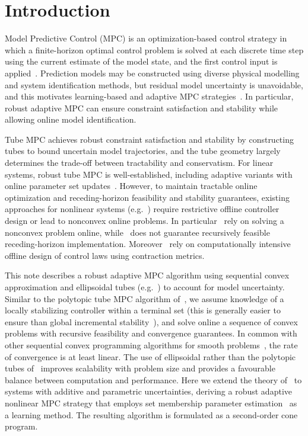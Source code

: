 \documentclass{IEEEtran}
\theoremstyle{definition}
\theoremstyle{remark}
\begin{document}
\section{Introduction}\label{introduction}
Model Predictive Control (MPC) is an optimization-based control strategy in which a finite-horizon optimal control problem is solved at each discrete time step using the current estimate of the model state, and the first control input is applied~\cite{Kou16}.
Prediction models may be constructed using diverse physical modelling and system identification methods, but residual model uncertainty is unavoidable, and this motivates learning-based and adaptive MPC strategies~\cite{Ade09,Lor19,Hew20}. In particular, robust adaptive MPC can ensure constraint satisfaction and stability while allowing online model identification.

%
Tube MPC achieves robust constraint satisfaction and stability by constructing tubes to bound uncertain model trajectories, and the tube geometry largely determines the trade-off between tractability and conservatism.
%
For linear systems, robust tube MPC is well-established, including adaptive variants with online parameter set updates~\cite{Lor19,Lu21}.  
%
However, to maintain tractable online optimization and receding-horizon feasibility and stability guarantees, existing approaches for nonlinear systems (e.g.~\cite{Ade09,Koh21,Sasfi23,leeman23,Bue24}) require restrictive offline controller design or lead to nonconvex online problems.
%
In particular~\cite{Ade09,Koh21,Sasfi23} rely on solving  a nonconvex problem online, while~\cite{leeman23} does not guarantee recursively feasible receding-horizon implementation.
%
Moreover~\cite{Koh21,Sasfi23} rely on computationally intensive offline design of control laws using contraction metrics.
%

This note describes a robust adaptive MPC algorithm   
using sequential convex approximation and ellipsoidal tubes (e.g.~\cite{kurzhanski02}) to account for model uncertainty. 
%
Similar to the polytopic tube MPC algorithm of~\cite{Bue24}, we assume knowledge of a locally stabilizing controller within a terminal set (this is generally easier to ensure than global incremental stability~\cite{Koh21,Sasfi23}), and solve online a sequence of convex problems with recursive feasibility and convergence guarantees. In common with other sequential convex programming algorithms for smooth problems~\cite{messerer21}, the rate of convergence is at least linear. 
%
The use of ellipsoidal rather than the polytopic tubes of~\cite{Bue24}  improves scalability with problem size and provides a favourable balance between computation and performance.
%
Here we extend the theory of~\cite{Can11} to systems with additive and parametric uncertainties, deriving a robust adaptive nonlinear MPC strategy that employs set membership parameter estimation~\cite{Lor19,Lu21} as a learning method. The resulting algorithm is formulated as a second-order cone program.
%
\end{document}
